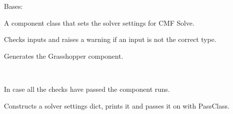\documentclass[letterpaper,10pt,english]{sphinxmanual}
\begin{document}

\begin{fulllineitems}
\label{\detokenize{cmf:livestock.components.comp_cmf.CMFSolverSettings}}
Bases: {\hyperref[\detokenize{superclass:livestock.components.component.GHComponent}]{}}

A component class that sets the solver settings for CMF Solve.

\begin{fulllineitems}
\label{\detokenize{cmf:livestock.components.comp_cmf.CMFSolverSettings.check_inputs}}
Checks inputs and raises a warning if an input is not the correct type.

\end{fulllineitems}


\begin{fulllineitems}
\label{\detokenize{cmf:livestock.components.comp_cmf.CMFSolverSettings.config}}
Generates the Grasshopper component.

\end{fulllineitems}


\begin{fulllineitems}
\label{\detokenize{cmf:livestock.components.comp_cmf.CMFSolverSettings.run}}~
\begin{DUlineblock}{0em}
\item[] In case all the checks have passed the component runs.
\item[] Constructs a solver settings dict, prints it and passes it on with PassClass.
\end{DUlineblock}

\end{fulllineitems}



\end{fulllineitems}
\end{document}

